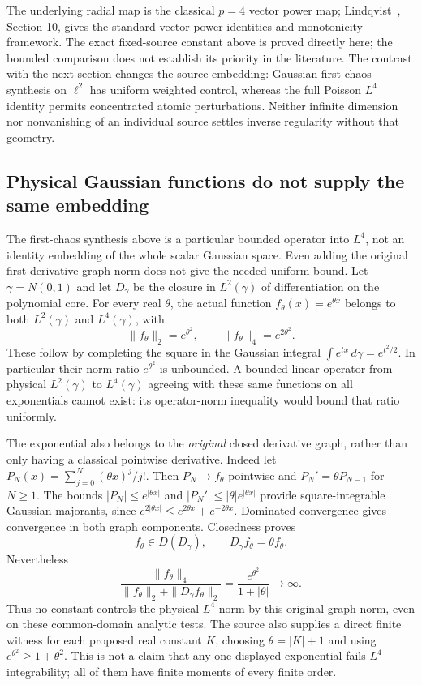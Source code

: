 \documentclass[11pt]{article}
\theoremstyle{remark}\newtheorem{remark}[theorem]{Remark}
\begin{document}
The underlying radial map is the classical $p=4$ vector power map;
Lindqvist~\cite{lindqvist}, Section 10, gives the standard vector
power identities and monotonicity framework. The exact fixed-source
constant above is proved directly here; the bounded comparison does
not establish its priority in the literature. The contrast with the
next section changes the source embedding: Gaussian first-chaos
synthesis on $\ell^2$ has uniform weighted control, whereas the full
Poisson $L^4$ identity permits concentrated atomic perturbations.
Neither infinite dimension nor nonvanishing of an individual source
settles inverse regularity without that geometry.


\subsection{Physical Gaussian functions do not supply the same embedding}
The first-chaos synthesis above is a particular bounded operator into
$L^4$, not an identity embedding of the whole scalar Gaussian space.
Even adding the original first-derivative graph norm does not give the
needed uniform bound. Let $\gamma=N(0,1)$ and let $D_\gamma$ be the
closure in $L^2(\gamma)$ of differentiation on the polynomial core.
For every real $\theta$, the actual function
$f_\theta(x)=e^{\theta x}$ belongs to both $L^2(\gamma)$ and
$L^4(\gamma)$, with
\[
 \|f_\theta\|_2=e^{\theta^2},\qquad
 \|f_\theta\|_4=e^{2\theta^2}.
\]
These follow by completing the square in the Gaussian integral
$\int e^{tx}\,d\gamma=e^{t^2/2}$. In particular their norm ratio
$e^{\theta^2}$ is unbounded. A bounded linear operator from physical
$L^2(\gamma)$ to $L^4(\gamma)$ agreeing with these same functions on
all exponentials cannot exist: its operator-norm inequality would
bound that ratio uniformly.

The exponential also belongs to the \emph{original} closed derivative
graph, rather than only having a classical pointwise derivative.
Indeed let $P_N(x)=\sum_{j=0}^N(\theta x)^j/j!$. Then
$P_N\to f_\theta$ pointwise and $P_N'=\theta P_{N-1}$ for $N\ge1$.
The bounds $|P_N|\le e^{|\theta x|}$ and
$|P_N'|\le|\theta|e^{|\theta x|}$ provide square-integrable Gaussian
majorants, since
$e^{2|\theta x|}\le e^{2\theta x}+e^{-2\theta x}$.
Dominated convergence gives convergence in both graph components.
Closedness proves
\[
 f_\theta\in D(D_\gamma),\qquad D_\gamma f_\theta=\theta f_\theta.
\]
Nevertheless
\[
 \frac{\|f_\theta\|_4}
      {\|f_\theta\|_2+\|D_\gamma f_\theta\|_2}
       =\frac{e^{\theta^2}}{1+|\theta|}\longrightarrow\infty.
\]
Thus no constant controls the physical $L^4$ norm by this original
graph norm, even on these common-domain analytic tests. The source
also supplies a direct finite witness for each proposed real constant
$K$, choosing $\theta=|K|+1$ and using $e^{\theta^2}\ge1+\theta^2$.
This is not a claim that any one displayed exponential fails $L^4$
integrability; all of them have finite moments of every finite order.
\end{document}
